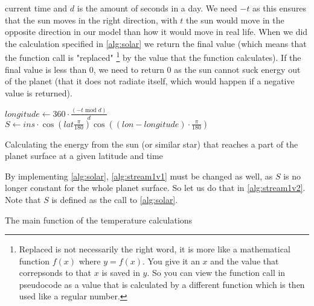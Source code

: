 current time and $d$ is the amount of seconds in a day. We need $-t$ as this ensures that the sun moves in the right direction, with $t$ the sun would move in the opposite direction in our model 
than how it would move in real life. When we did the calculation specified in \autoref{alg:solar} we return the final value (which means that the function call is "replaced" 
\footnote{Replaced is not necessarily the right word, it is more like a mathematical function $f(x)$ where $y = f(x)$. You give it an $x$ and the value that correpsonds to that $x$ is saved in 
$y$. So you can view the function call in pseudocode as a value that is calculated by a different function which is then used like a regular number.} by the value that the function calculates). 
If the final value is less than 0, we need to return 0 as the sun cannot suck energy out of the planet (that it does not radiate itself, which would happen if a negative value is returned).

\begin{algorithm}[hbt]
    \SetAlgoLined
    $longitude \leftarrow 360 \cdot \frac{(-t \text{ mod } d)}{d}$ \;
    $S \leftarrow ins \cdot \cos(lat \frac{\pi}{180}) \cos((lon - longitude) \cdot \frac{\pi}{180})$ \;
    \caption{Calculating the energy from the sun (or similar star) that reaches a part of the planet surface at a given latitude and time}
    \label{alg:solar}
\end{algorithm}

By implementing \autoref{alg:solar}, \autoref{alg:stream1v1} must be changed as well, as $S$ is no longer constant for the whole planet surface. So let us do that in \autoref{alg:stream1v2}. Note 
that $S$ is defined as the call to \autoref{alg:solar}. 
\begin{algorithm}[hbt]
    \SetAlgoLined

    \caption{The main function of the temperature calculations}
    \label{alg:stream1v2}
\end{algorithm}